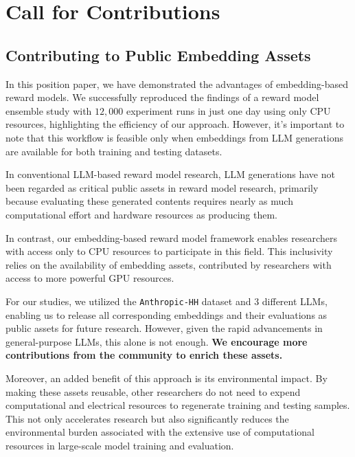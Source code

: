 \section{Call for Contributions}
\label{sec:future_works}
\subsection{Contributing to Public Embedding Assets}
In this position paper, we have demonstrated the advantages of embedding-based reward models. We successfully reproduced the findings of a reward model ensemble study with $12,000$ experiment runs in just one day using only CPU resources, highlighting the efficiency of our approach. However, it's important to note that this workflow is feasible only when embeddings from LLM generations are available for both training and testing datasets.

In conventional LLM-based reward model research, LLM generations have not been regarded as critical public assets in reward model research, primarily because evaluating these generated contents requires nearly as much computational effort and hardware resources as producing them.

In contrast, our embedding-based reward model framework enables researchers with access only to CPU resources to participate in this field. This inclusivity relies on the availability of embedding assets, contributed by researchers with access to more powerful GPU resources.

For our studies, we utilized the \texttt{Anthropic-HH} dataset and $3$ different LLMs, enabling us to release all corresponding embeddings and their evaluations as public assets for future research. However, given the rapid advancements in general-purpose LLMs, this alone is not enough. \textbf{We encourage more contributions from the community to enrich these assets.}

Moreover, an added benefit of this approach is its environmental impact. By making these assets reusable, other researchers do not need to expend computational and electrical resources to regenerate training and testing samples. This not only accelerates research but also significantly reduces the environmental burden associated with the extensive use of computational resources in large-scale model training and evaluation.


